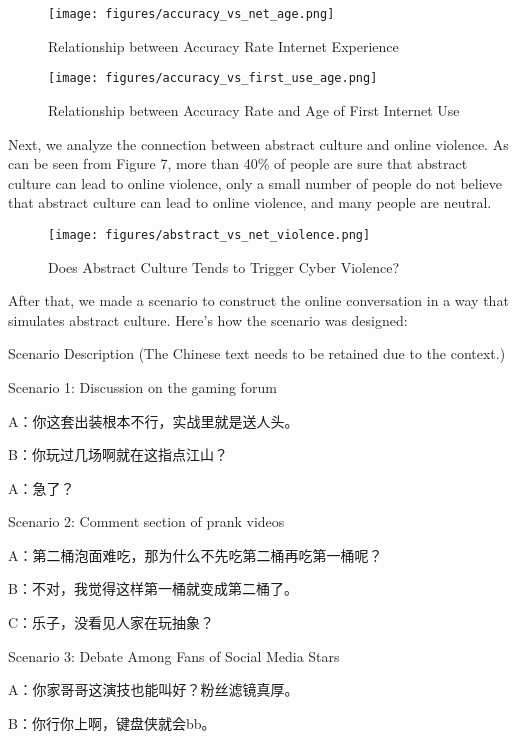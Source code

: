 \documentclass[12pt,a4paper]{ctexart}
\theoremstyle{MyLineTheoremStyle}
\theoremstyle{MyBlockTheoremStyle}
\theoremstyle{MySubsubsectionStyle}
\begin{document}
\begin{figure}[htbp]
    \centering
    \texttt{[image: figures/accuracy\_vs\_net\_age.png]}
    \caption{Relationship between Accuracy Rate Internet Experience}
    \label{fig:accuracy_vs_net_age}
\end{figure}
\newpage

\begin{figure}[htbp]
    \centering
    \texttt{[image: figures/accuracy\_vs\_first\_use\_age.png]}
    \caption{Relationship between Accuracy Rate and Age of First Internet Use}
    \label{fig:accuracy_vs_first_use_age}
\end{figure}
\newpage

Next, we analyze the connection between abstract culture and online violence. As can be seen from Figure 7, more than 40\% of people are sure that abstract culture can lead to online violence, only a small number of people do not believe that abstract culture can lead to online violence, and many people are neutral.

\begin{figure}[htbp]
    \centering
    \texttt{[image: figures/abstract\_vs\_net\_violence.png]}
    \caption{Does Abstract Culture Tends to Trigger Cyber Violence?}
    \label{fig:abstract_vs_net_violence}
\end{figure}
\newpage

After that, we made a scenario to construct the online conversation in a way that simulates abstract culture. Here's how the scenario was designed:

Scenario Description (The Chinese text needs to be retained due to the context.)

Scenario 1: Discussion on the gaming forum

A：你这套出装根本不行，实战里就是送人头。

B：你玩过几场啊就在这指点江山？

A：急了？

Scenario 2: Comment section of prank videos

A：第二桶泡面难吃，那为什么不先吃第二桶再吃第一桶呢？

B：不对，我觉得这样第一桶就变成第二桶了。

C：乐子，没看见人家在玩抽象？

Scenario 3: Debate Among Fans of Social Media Stars

A：你家哥哥这演技也能叫好？粉丝滤镜真厚。

B：你行你上啊，键盘侠就会bb。
\end{document}
